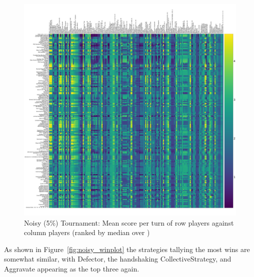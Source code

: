 \documentclass{article}
\begin{document}
\begin{figure}[!hbtp]
    \centering
    \includegraphics[width=\textwidth]{./assets/noisy_scores_heatmap.pdf}
    \caption{Noisy (5\%) Tournament: Mean score per turn of row players against
    column players (ranked by median over
        \protecttournaments)}
    \label{fig:noisy_heatmap}
\end{figure}

As shown in Figure~\ref{fig:noisy_winplot} the strategies tallying the most wins
are somewhat similar, with Defector, the handshaking CollectiveStrategy, and
Aggravate appearing as the top three again.
\end{document}
